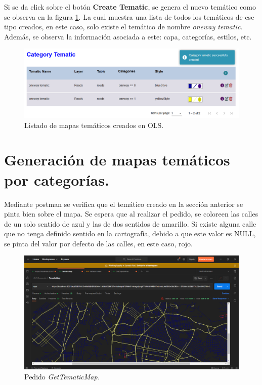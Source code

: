 Si se da click sobre el bot\'on \textbf{Create Tematic}, se genera el nuevo tem\'atico como se observa en la figura \ref{listTematic}. La cual muestra una lista de todos los tem\'aticos de ese tipo creados, en este caso, solo existe el tem\'atico de nombre \textit{oneway tematic}. Adem\'as, se observa la informaci\'on asociada a este: capa, categor\'ias, estilos, etc.

\begin{figure}[h]
\centering
\label{listTematic}
\includegraphics[scale=0.4]{images/listTematic.png} 
\caption{Listado de mapas tem\'aticos creados en OLS.}
\end{figure}


\section{Generaci\'on de mapas tem\'aticos por categor\'ias.}
Mediante postman se verifica que el tem\'atico creado en la secci\'on anterior se pinta bien sobre el mapa. Se espera que al realizar el pedido, se coloreen las calles de un solo sentido de azul y las de dos sentidos de amarillo. Si existe alguna calle que no tenga definido sentido en la cartograf\'ia, debido a que este valor es NULL, se pinta del valor por defecto de las calles, en este caso, rojo.

\begin{figure}[h]
\centering
\label{postmanTematic}
\includegraphics[scale=0.4]{images/postmanTematic.png} 
\caption{Pedido \textit{GetTematicMap.}}
\end{figure}

